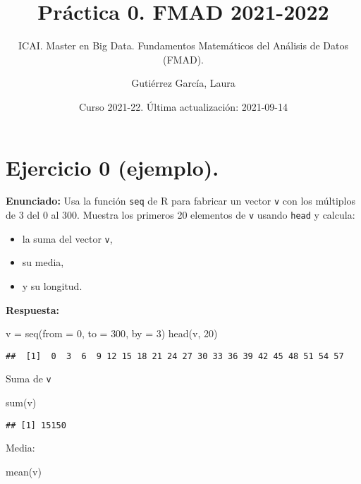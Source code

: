 \documentclass[
]{article}
\title{Práctica 0. FMAD 2021-2022}
\subtitle{ICAI. Master en Big Data. Fundamentos Matemáticos del Análisis
de Datos (FMAD).}
\author{Gutiérrez García, Laura}
\date{Curso 2021-22. Última actualización: 2021-09-14}
\newenvironment{Shaded}{\begin{snugshade}}{\end{snugshade}}
\newcommand{\AttributeTok}[1]{\textcolor[rgb]{0.77,0.63,0.00}{#1}}
\newcommand{\DecValTok}[1]{\textcolor[rgb]{0.00,0.00,0.81}{#1}}
\newcommand{\FunctionTok}[1]{\textcolor[rgb]{0.00,0.00,0.00}{#1}}
\newcommand{\NormalTok}[1]{#1}
\newcommand{\OtherTok}[1]{\textcolor[rgb]{0.56,0.35,0.01}{#1}}
\providecommand{\tightlist}{%
  \setlength{\itemsep}{0pt}\setlength{\parskip}{0pt}}
\begin{document}
\maketitle

\hypertarget{ejercicio-0-ejemplo.}{%
\section{Ejercicio 0 (ejemplo).}\label{ejercicio-0-ejemplo.}}

\textbf{Enunciado:} Usa la función \texttt{seq} de R para fabricar un
vector \texttt{v} con los múltiplos de 3 del 0 al 300. Muestra los
primeros 20 elementos de \texttt{v} usando \texttt{head} y calcula:

\begin{itemize}
\tightlist
\item
  la suma del vector \texttt{v},
\item
  su media,
\item
  y su longitud.
\end{itemize}

\textbf{Respuesta:}

\begin{Shaded}
\begin{Highlighting}[]
\NormalTok{v }\OtherTok{=} \FunctionTok{seq}\NormalTok{(}\AttributeTok{from =} \DecValTok{0}\NormalTok{, }\AttributeTok{to =} \DecValTok{300}\NormalTok{, }\AttributeTok{by =} \DecValTok{3}\NormalTok{)}
\FunctionTok{head}\NormalTok{(v, }\DecValTok{20}\NormalTok{)}
\end{Highlighting}
\end{Shaded}

\begin{verbatim}
##  [1]  0  3  6  9 12 15 18 21 24 27 30 33 36 39 42 45 48 51 54 57
\end{verbatim}

Suma de \texttt{v}

\begin{Shaded}
\begin{Highlighting}[]
\FunctionTok{sum}\NormalTok{(v)}
\end{Highlighting}
\end{Shaded}

\begin{verbatim}
## [1] 15150
\end{verbatim}

Media:

\begin{Shaded}
\begin{Highlighting}[]
\FunctionTok{mean}\NormalTok{(v)}
\end{Highlighting}
\end{Shaded}
\end{document}
